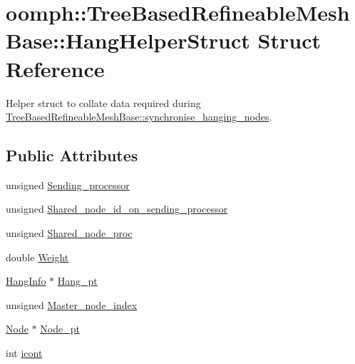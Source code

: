 \hypertarget{structoomph_1_1TreeBasedRefineableMeshBase_1_1HangHelperStruct}{}\section{oomph\+:\+:Tree\+Based\+Refineable\+Mesh\+Base\+:\+:Hang\+Helper\+Struct Struct Reference}
\label{structoomph_1_1TreeBasedRefineableMeshBase_1_1HangHelperStruct}


Helper struct to collate data required during \hyperlink{classoomph_1_1TreeBasedRefineableMeshBase_a0ba902eb4b63aaa8c4da1aadcf25709a}{Tree\+Based\+Refineable\+Mesh\+Base\+::synchronise\+\_\+hanging\+\_\+nodes}.  


\subsection*{Public Attributes}
\begin{DoxyCompactItemize}
\item 
unsigned \hyperlink{structoomph_1_1TreeBasedRefineableMeshBase_1_1HangHelperStruct_a293cbfe9698ea90db02075cd4c5aa539}{Sending\+\_\+processor}
\item 
unsigned \hyperlink{structoomph_1_1TreeBasedRefineableMeshBase_1_1HangHelperStruct_acd0bbce82b5faf25ff369c9746414467}{Shared\+\_\+node\+\_\+id\+\_\+on\+\_\+sending\+\_\+processor}
\item 
unsigned \hyperlink{structoomph_1_1TreeBasedRefineableMeshBase_1_1HangHelperStruct_a28da444296c07df207c92baf457a7cbf}{Shared\+\_\+node\+\_\+proc}
\item 
double \hyperlink{structoomph_1_1TreeBasedRefineableMeshBase_1_1HangHelperStruct_a9fe8ccacbdb16699f3b8909c184847de}{Weight}
\item 
\hyperlink{classoomph_1_1HangInfo}{Hang\+Info} $\ast$ \hyperlink{structoomph_1_1TreeBasedRefineableMeshBase_1_1HangHelperStruct_a3ae5d1dcd6c1f8575cd729580e8cbb26}{Hang\+\_\+pt}
\item 
unsigned \hyperlink{structoomph_1_1TreeBasedRefineableMeshBase_1_1HangHelperStruct_ad27054cbdb0f2aee8cc57e2cdd068941}{Master\+\_\+node\+\_\+index}
\item 
\hyperlink{classoomph_1_1Node}{Node} $\ast$ \hyperlink{structoomph_1_1TreeBasedRefineableMeshBase_1_1HangHelperStruct_ad427be917515d875cabad06307e9ae03}{Node\+\_\+pt}
\item 
int \hyperlink{structoomph_1_1TreeBasedRefineableMeshBase_1_1HangHelperStruct_af54b83ec0892b7c9f67419dd36d57933}{icont}
\end{DoxyCompactItemize}


